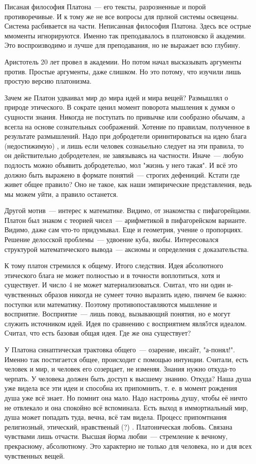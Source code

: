 Писаная философия Платона~--- его тексты, разрозненные и порой противоречивые. И к тому же не все вопросы для прлной системы освещены. Система расбивается на части. 
Неписанная философия Платона. Здесь все острые ммоменты игнорируются. Именно так преподавалось в платоновско й академии. Это воспроизводимо и лучше для преподавания, но не выражает всю глубину. 

Аристотель 20 лет провел в академии. Но потом начал высказывать аргументы против. Простые аргументы, даже слишком. Но это потому, что изучили лишь простую версию платонизма. 

Зачем же Платон удваивал мир до мира идей и мира вещей?
Размышлял о природе этического. В сократе ценил момент поворота мышления к думкм о сущности знания. Никогда не поступать по привычке или сообразно обычаям, а всегла на основе сознательных соображений. 
Хотение по правилам, полученное в результате размышлений. Надо при добродетели ориннтироваться на идею блага (недостижимую) , и лишь если человек сознаьельно следует на эти правила, то он действительно добродетелен, не завязываясь на частности. 
Иначе~--- любую подлость можно объявить добродетелью, мол "жизнь у него такая". 
И всё это должно быть выражено в формате понятий~--- строгих дефениций. Кстати где живет общее правило? Оно не такое, как наши эмпирические представления, ведь мы можем уйти, а правило останется. 

Другой мотив~--- интерес к математике. Видимо, от знакомства с пифагорейцами. 
Платон был знаком с теорией чисел~--- арифметикой в пифагорейском варианте. Видимо, даже сам что-то придумывал. Еще и геометрия, учение о пропорциях. 
Решение делосской проблемы~--- удвоение куба, якобы. Интересовался структурой математического вывода~--- аксиомы и определения с доказательства. 

К тому платон стремился к общему. Итого следствия. 
Идея абсолютного этического блага не может полностью и в точности воплотиться, хотя и существует. И число 4 не может материализоваться. Считал, что ни один и- чувственных образов никогда не сумеет точно выразить идею, пничем 6е важно: поступки или математику. Поэтому противопоставляются мышление и восприятие. 
Восприятие~--- лишь повод, вызывающий понятия, но е могут служить источником идей. Идея по сравнению с восприятием явля5тся идеалом. Считал, что есть базовая общая идея. Где же она существует?

У Платона синаптическая трактовка общего~--- озарение, инсайт, "а-понял!". Именно так постигается общее, происходит с помощью интуиции. Считали, есть человек и мир, и человек его созерцает, не изменяя. 
Знания нужно откуда-то черпать. У человека должен быть доступ к высшему знанию. Откуда? Наша душа уже видела все эти идеи и способна их припомнить, т. е. в момент рождения душа уже всё знает. 
Но помнит она мало. Надо настроиьь душу, чтобы её ничто не отвлекало и она спокойно всё вспоминала. 
Есть выход в иммортиальный мир, душа может попадать туда, вечна, всё там видела. Процесс припомтнания религиозный, этический, нравственый (?) . Платоническая любовь. Связана чувствами лишь отчасти. Высшая йорма любви~--- стремление к вечному, прекрасному, абсолютному. Это характерно не только для человека, но и для всех чувственных вещей. 
